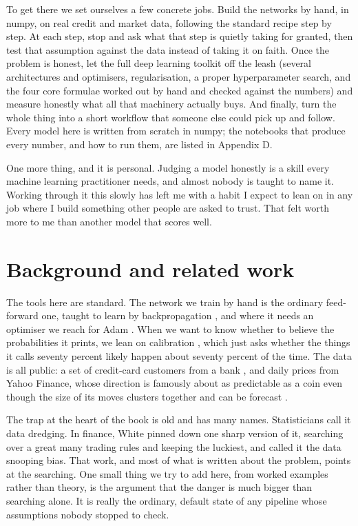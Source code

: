 \documentclass[11pt]{article} %
\begin{document}
To get there we set ourselves a few concrete jobs. Build the networks by hand, in numpy, on real credit and market data, following the standard recipe step by step. At each step, stop and ask what that step is quietly taking for granted, then test that assumption against the data instead of taking it on faith. Once the problem is honest, let the full deep learning toolkit off the leash (several architectures and optimisers, regularisation, a proper hyperparameter search, and the four core formulae worked out by hand and checked against the numbers) and measure honestly what all that machinery actually buys. And finally, turn the whole thing into a short workflow that someone else could pick up and follow. Every model here is written from scratch in numpy; the notebooks that produce every number, and how to run them, are listed in Appendix D.

One more thing, and it is personal. Judging a model honestly is a skill every machine learning practitioner needs, and almost nobody is taught to name it. Working through it this slowly has left me with a habit I expect to lean on in any job where I build something other people are asked to trust. That felt worth more to me than another model that scores well.


\section*{Background and related work}


The tools here are standard. The network we train by hand is the ordinary feed-forward one, taught to learn by backpropagation \cite{rumelhart:1986}, and where it needs an optimiser we reach for Adam \cite{kingma:2015}. When we want to know whether to believe the probabilities it prints, we lean on calibration \cite{guo:2017}, which just asks whether the things it calls seventy percent likely happen about seventy percent of the time. The data is all public: a set of credit-card customers from a bank \cite{yeh:2009}, and daily prices from Yahoo Finance, whose direction is famously about as predictable as a coin \cite{malkiel:1973} even though the size of its moves clusters together and can be forecast \cite{engle:1982}.

The trap at the heart of the book is old and has many names. Statisticians call it data dredging. In finance, White \cite{white:2000} pinned down one sharp version of it, searching over a great many trading rules and keeping the luckiest, and called it the data snooping bias. That work, and most of what is written about the problem, points at the searching. One small thing we try to add here, from worked examples rather than theory, is the argument that the danger is much bigger than searching alone. It is really the ordinary, default state of any pipeline whose assumptions nobody stopped to check.
\end{document}
